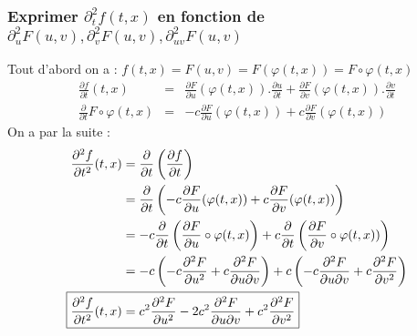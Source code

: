 \documentclass[12pt]{article}
\begin{document}
\subsubsection{Exprimer $\partial^{2}_{t} f(t,x)$ en fonction de $ \partial^{2}_{u} F(u,v),\partial^{2}_{v} F(u,v),\partial^{2}_{uv} F(u,v)$}
Tout d'abord on a : $f(t,x)=F(u,v)=F(\varphi (t,x))=F\circ \varphi (t,x)$
\[
\begin{matrix}
\frac{\partial f}{\partial t}(t,x) & = & \frac{\partial F}{\partial u}(\varphi(t,x)).\frac{\partial u}{\partial t} + \frac{\partial F}{\partial v}(\varphi(t,x)).\frac{\partial v}{\partial t} \\[0.4cm]
\frac{\partial}{\partial t}F\circ \varphi(t,x) & = & -c\frac{\partial F}{\partial u}(\varphi(t,x)) +c\frac{\partial F}{\partial v}(\varphi(t,x))
\end{matrix}
\]
On a par la suite :
\begin{align}
\frac{\partial^2 f}{\partial t^2}(t,x) &=\frac{\partial}{\partial t}\left(\frac{\partial f}{\partial t}\right) \notag \\
&=\frac{\partial}{\partial t}\left( -c\frac{\partial F}{\partial u}(\varphi(t,x)) + c\frac{\partial F}{\partial v}(\varphi(t,x))\right) \notag \\ 
&=-c\frac{\partial}{\partial t}\left( \frac{\partial F}{\partial u}\circ\varphi(t,x)\right) + c\frac{\partial}{\partial t}\left( \frac{\partial F}{\partial v}\circ\varphi(t,x))\right) \notag \\
&=-c\left( -c\frac{\partial^2 F}{\partial u^2} + c\frac{\partial^2 F}{\partial u \partial v} \right) + c\left( -c\frac{\partial^2 F}{\partial u \partial v} + c\frac{\partial^2 F}{\partial v^2} \right) \notag \\
\Aboxed{\frac{\partial^2 f}{\partial t^2}(t,x) &=c^2\frac{\partial^2 F}{\partial u^2}-2c^2\frac{\partial^2 F}{\partial u \partial v}+c^2\frac{\partial^2 F}{\partial v^2}}
\end{align}
\end{document}
